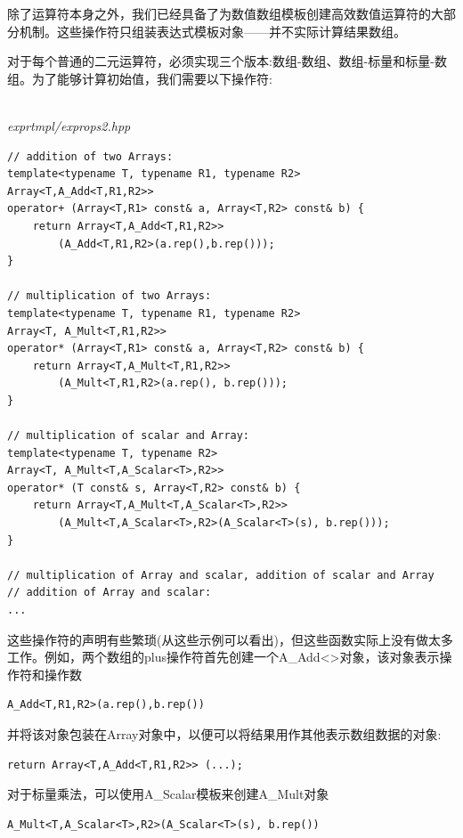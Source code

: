除了运算符本身之外，我们已经具备了为数值数组模板创建高效数值运算符的大部分机制。这些操作符只组装表达式模板对象——并不实际计算结果数组。

对于每个普通的二元运算符，必须实现三个版本:数组-数组、数组-标量和标量-数组。为了能够计算初始值，我们需要以下操作符:

\hspace*{\fill} \\ %
\noindent
\textit{exprtmpl/exprops2.hpp}
\begin{lstlisting}[style=styleCXX]
// addition of two Arrays:
template<typename T, typename R1, typename R2>
Array<T,A_Add<T,R1,R2>>
operator+ (Array<T,R1> const& a, Array<T,R2> const& b) {
	return Array<T,A_Add<T,R1,R2>>
		(A_Add<T,R1,R2>(a.rep(),b.rep()));
}

// multiplication of two Arrays:
template<typename T, typename R1, typename R2>
Array<T, A_Mult<T,R1,R2>>
operator* (Array<T,R1> const& a, Array<T,R2> const& b) {
	return Array<T,A_Mult<T,R1,R2>>
		(A_Mult<T,R1,R2>(a.rep(), b.rep()));
}

// multiplication of scalar and Array:
template<typename T, typename R2>
Array<T, A_Mult<T,A_Scalar<T>,R2>>
operator* (T const& s, Array<T,R2> const& b) {
	return Array<T,A_Mult<T,A_Scalar<T>,R2>>
		(A_Mult<T,A_Scalar<T>,R2>(A_Scalar<T>(s), b.rep()));
}

// multiplication of Array and scalar, addition of scalar and Array
// addition of Array and scalar:
...
\end{lstlisting}

这些操作符的声明有些繁琐(从这些示例可以看出)，但这些函数实际上没有做太多工作。例如，两个数组的plus操作符首先创建一个A\_Add<>对象，该对象表示操作符和操作数

\begin{lstlisting}[style=styleCXX]
A_Add<T,R1,R2>(a.rep(),b.rep())
\end{lstlisting}

并将该对象包装在Array对象中，以便可以将结果用作其他表示数组数据的对象:

\begin{lstlisting}[style=styleCXX]
return Array<T,A_Add<T,R1,R2>> (...);
\end{lstlisting}

对于标量乘法，可以使用A\_Scalar模板来创建A\_Mult对象

\begin{lstlisting}[style=styleCXX]
A_Mult<T,A_Scalar<T>,R2>(A_Scalar<T>(s), b.rep())
\end{lstlisting}


